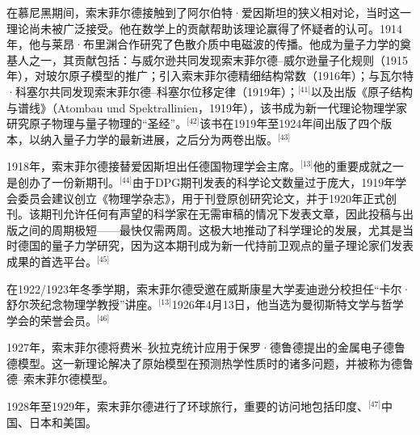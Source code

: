 在慕尼黑期间，索末菲尔德接触到了阿尔伯特·爱因斯坦的狭义相对论，当时这一理论尚未被广泛接受。他在数学上的贡献帮助该理论赢得了怀疑者的认可。1914年，他与莱昂·布里渊合作研究了色散介质中电磁波的传播。他成为量子力学的奠基人之一，其贡献包括：与威尔逊共同发现索末菲尔德–威尔逊量子化规则（1915年），对玻尔原子模型的推广；引入索末菲尔德精细结构常数（1916年）；与瓦尔特·科塞尔共同发现索末菲尔德–科塞尔位移定律（1919年）；\(^\text{[41]}\)以及出版《原子结构与谱线》（Atombau und Spektrallinien，1919年），该书成为新一代理论物理学家研究原子物理与量子物理的“圣经”。\(^\text{[42]}\)该书在1919年至1924年间出版了四个版本，以纳入量子力学的最新进展，之后分为两卷出版。\(^\text{[43]}\)

1918年，索末菲尔德接替爱因斯坦出任德国物理学会主席。\(^\text{[13]}\)他的重要成就之一是创办了一份新期刊。\(^\text{[44]}\)由于DPG期刊发表的科学论文数量过于庞大，1919年学会委员会建议创立《物理学杂志》，用于刊登原创研究论文，并于1920年正式创刊。该期刊允许任何有声望的科学家在无需审稿的情况下发表文章，因此投稿与出版之间的周期极短——最快仅需两周。这极大地推动了科学理论的发展，尤其是当时德国的量子力学研究，因为这本期刊成为新一代持前卫观点的量子理论家们发表成果的首选平台。\(^\text{[45]}\)

在1922/1923年冬季学期，索末菲尔德受邀在威斯康星大学麦迪逊分校担任“卡尔·舒尔茨纪念物理学教授”讲座。\(^\text{[13]}\)1926年4月13日，他当选为曼彻斯特文学与哲学学会的荣誉会员。\(^\text{[46]}\)

1927年，索末菲尔德将费米–狄拉克统计应用于保罗·德鲁德提出的金属电子德鲁德模型。这一新理论解决了原始模型在预测热学性质时的诸多问题，并被称为德鲁德–索末菲尔德模型。

1928年至1929年，索末菲尔德进行了环球旅行，重要的访问地包括印度、\(^\text{[47]}\)中国、日本和美国。

